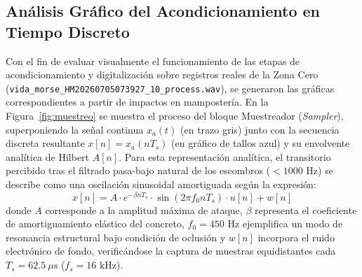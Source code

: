 \documentclass[11pt, a4paper]{article}
\begin{document}
\begin{table}[htbp]
\centering
\caption{Comparativa de Parámetros Físicos: Verdad Base Real (Zona Cero) vs. Generación Estocástica PDS}
\label{tab:verdad_base}
\end{table}

\subsection{Análisis Gráfico del Acondicionamiento en Tiempo Discreto}
Con el fin de evaluar visualmente el funcionamiento de las etapas de acondicionamiento y digitalización sobre registros reales de la Zona Cero (\texttt{vida\_morse\_HM20260705073927\_10\_process.wav}), se generaron las gráficas correspondientes a partir de impactos en mampostería. En la Figura~\ref{fig:muestreo} se muestra el proceso del bloque Muestreador (\textit{Sampler}), superponiendo la señal continua $x_a(t)$ (en trazo gris) junto con la secuencia discreta resultante $x[n] = x_a(nT_s)$ (en gráfico de tallos azul) y su envolvente analítica de Hilbert $A[n]$. Para esta representación analítica, el transitorio percibido tras el filtrado pasa-bajo natural de los escombros ($<1000\text{ Hz}$) se describe como una oscilación sinusoidal amortiguada según la expresión:
\begin{equation}
    x[n] = A \cdot e^{-\beta n T_s} \cdot \sin(2\pi f_0 n T_s) \cdot u[n] + w[n]
\end{equation}
donde $A$ corresponde a la amplitud máxima de ataque, $\beta$ representa el coeficiente de amortiguamiento elástico del concreto, $f_0 = 450\text{ Hz}$ ejemplifica un modo de resonancia estructural bajo condición de oclusión y $w[n]$ incorpora el ruido electrónico de fondo, verificándose la captura de muestras equidistantes cada $T_s = 62.5\ \mu\text{s}$ ($f_s = 16\text{ kHz}$).
\end{document}
